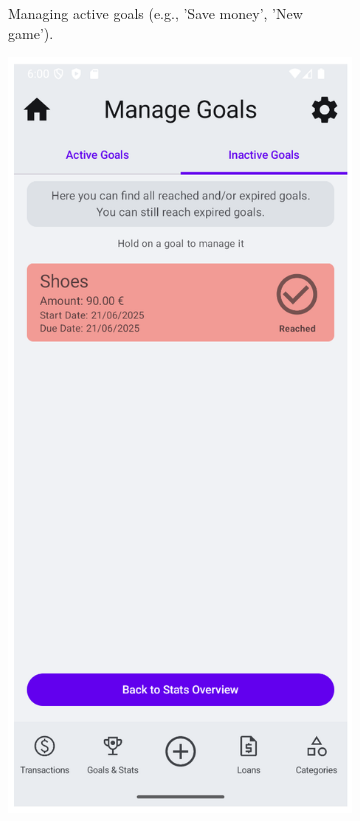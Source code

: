 \documentclass[a4paper,12pt]{article}
\begin{document}
\begin{figure}[H]
\begin{subfigure}[b]{0.23\textwidth}
        \caption{Managing active goals (e.g., 'Save money', 'New game').}
        \label{fig:manage_goals_active}
    \end{subfigure}
    \hfill
    \begin{subfigure}[b]{0.23\textwidth}
        \includegraphics[width=\textwidth]{manage_goals_inactive.png}

\end{subfigure}
\end{figure}
\end{document}
